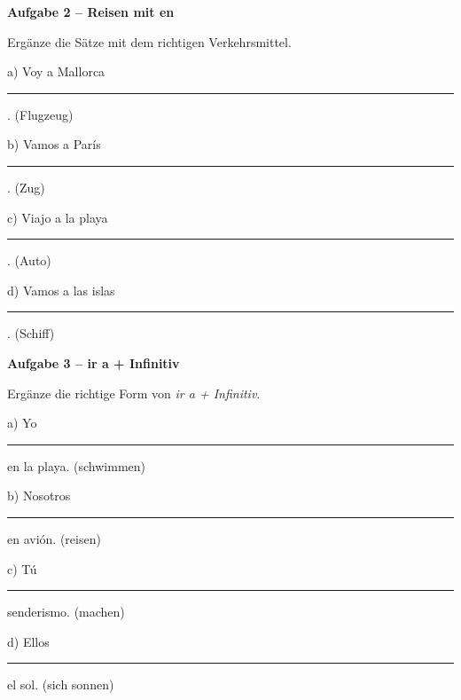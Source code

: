 \documentclass[11pt, a4paper]{article}
\newcommand{\fachfarbe}{spanisch}
\newcommand{\punktebox}[1]{\hfill\fbox{\small \_/#1}}
\newcommand{\luecke}[1]{\rule{#1}{0.4pt}}
\newenvironment{aufgabe}[1]{%
    \needspace{5\baselineskip}%
    \nopagebreak[4]%
    \vspace{10pt}
    \noindent\textbf{\textcolor{\fachfarbe}{Aufgabe #1}}
    \nopagebreak[4]%
    \vspace{5pt}
    \nopagebreak[4]%
    \begin{list}{}{\leftmargin=0pt}
    \item[]
}{%
    \end{list}
}
\newcommand{\es}[1]{\textcolor{\fachfarbe}{\textbf{#1}}}
\begin{document}

\begin{aufgabe}{2 -- Reisen mit \es{en}}
Ergänze die Sätze mit dem richtigen Verkehrsmittel. \punktebox{4}
\end{aufgabe}

\noindent
a) Voy a Mallorca \luecke{4cm}. \hfill (Flugzeug)

\vspace{0.8em}

\noindent
b) Vamos a París \luecke{4cm}. \hfill (Zug)

\vspace{0.8em}

\noindent
c) Viajo a la playa \luecke{4cm}. \hfill (Auto)

\vspace{0.8em}

\noindent
d) Vamos a las islas \luecke{4cm}. \hfill (Schiff)

\vspace{15pt}


\begin{aufgabe}{3 -- ir a + Infinitiv}
Ergänze die richtige Form von \textit{ir a + Infinitiv}. \punktebox{8}
\end{aufgabe}

\noindent
a) Yo \luecke{5cm} en la playa. \hfill (schwimmen)

\vspace{0.8em}

\noindent
b) Nosotros \luecke{5cm} en avión. \hfill (reisen)

\vspace{0.8em}

\noindent
c) Tú \luecke{5cm} senderismo. \hfill (machen)

\vspace{0.8em}

\noindent
d) Ellos \luecke{5cm} el sol. \hfill (sich sonnen)

\vspace{15pt}

\end{document}

